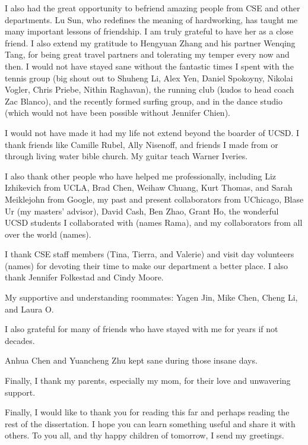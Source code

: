 \documentclass[12pt]{ucsddissertation}
\begin{document}
\begin{acknowledgements}
I also had the great opportunity to befriend amazing people from CSE and other departments. Lu Sun, who redefines the meaning of hardworking, has taught me many important lessons of friendship. I am truly grateful to have her as a close friend. I also extend my gratitude to Hengyuan Zhang and his partner Wenqing Tang, for being great travel partners and tolerating my temper every now and then. I would not have stayed sane without the fantastic times I spent with the tennis group (big shout out to Shuheng Li, Alex Yen, Daniel Spokoyny, Nikolai Vogler, Chris Priebe, Nithin Raghavan), the running club (kudos to head coach Zac Blanco), and the recently formed surfing group, and in the dance studio (which would not have been possible without Jennifer Chien).

I would not have made it had my life not extend beyond the boarder of UCSD. I thank friends like Camille Rubel, Ally Nisenoff, and friends I made from or through living water bible church. My guitar teach Warner Iveries.

I also thank other people who have helped me professionally, including Liz Izhikevich from UCLA, Brad Chen, Weihaw Chuang, Kurt Thomas, and Sarah Meiklejohn from Google, my past and present collaborators from UChicago, Blase Ur (my masters' advisor), David Cash, Ben Zhao, Grant Ho, the wonderful UCSD students I collaborated with (names Rama), and my collaborators from all over the world (names).

I thank CSE staff members (Tina, Tierra, and Valerie) and visit day volunteers (names) for devoting their time to make our department a better place. I also thank Jennifer Folkestad and Cindy Moore.

My supportive and understanding roommates: Yagen Jin, Mike Chen, Cheng Li, and Laura O. 

I also grateful for many of friends who have stayed with me for years if not decades.

Anhua Chen and Yuancheng Zhu kept sane during those insane days.

Finally, I thank my parents, especially my mom, for their love and unwavering support.

Finally, I would like to thank you for reading this far and perhaps reading the rest of the dissertation. I hope you can learn something useful and share it with others. To you all, and thy happy children of tomorrow, I send my greetings.


\end{acknowledgements}
\end{document}
